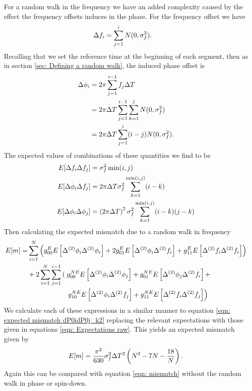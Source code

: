 For a random walk in the frequency we have an added complexity caused by the
effect the frequency offsets induces in the phase. For the frequency offset we 
have
\begin{align}
\Delta f_{i} &= \sum_{j=1}^{i}N(0, \sigma_{f}^{2}).
\end{align}
Recalling that we set the reference time at the beginning of each segment, 
then as in section \ref{sec: Defining a random walk}, the induced phase offset is
\begin{align}
\Delta\phi_{i} &=2\pi \sum_{j=1}^{i-1}f_{j}\Delta T \\
 & = 2\pi\Delta T \sum_{j=1}^{i-1}\sum_{k=1}^{j}N(0, \sigma_{f}^{2}) \\
& = 2\pi\Delta T \sum_{j=1}^{i}(i-j)N(0, \sigma_{f}^{2}).
\end{align}
The expected values of combinations of these quantities we find to be
\begin{align}
E[\Delta f_{i}\Delta f_{j}] & = \sigma_{f}^{2} \min(i, j) \\
E[\Delta\phi_{i}\Delta f_{j}] & = 2 \pi \Delta T \sigma_{f}^{2} \sum_{k=1}^{\min(i, j)}(i-k)\\
E[\Delta\phi_{i}\Delta\phi_{j}] & = 
\left(2\pi\Delta T\right)^{2}\sigma_{f}^{2} \sum_{k=1}^{\min(i, j)}(i-k)(j-k)
\label{eqn: Expectations raw}
\end{align}
Then calculating the expected mismatch due to a random walk in frequency 
\begin{align}
E[m] = & 
\s{i=1}{N}\left(g_{00}^{E}E\left[\Delta^{(2)}\phi_{i}\Delta^{(2)}\phi_{i}\right] 
+ 2 g_{01}^{E}E\left[\Delta^{(2)}\phi_{i}\Delta^{(2)}\f_{i}\right] 
+  g_{11}^{E} E\left[\Delta^{(2)}\f_{i}\Delta^{(2)}\f_{i}\right] \right) \\
& + 2\s{i=1}{N}\s{j=1}{i-1}\left(\right.
g_{00}^{NE}E\left[\Delta^{(2)}\phi_{i}\Delta^{(2)}\phi_{j}\right] + 
g_{01}^{NE}E\left[\Delta^{(2)}\phi_{j}\Delta^{(2)}\f_{i}\right] +  \\ 
&\hspace{20mm}\left. g_{10}^{NE}E\left[\Delta^{(2)}\phi_{i}\Delta^{(2)}\f_{j}\right] + 
g_{11}^{NE} E\left[\Delta^{(2)}\f_{i}\Delta^{(2)}\f_{j}\right] \right)
\end{align}
We calculate each of these expressions in a similar manner to equation
\eqref{eqn: expected mismatch dP0idP0j_k2} replacing the relevant expectations
with those given in equations \eqref{eqn: Expectations raw}. This yields an
expected mismatch given by 
\begin{equation}
E[m] = \frac{\pi^{2} }{630} \sigma_{f}^{2} \Delta T^{2}  \left(N^{3} - 7N- \frac{18}{N} \right).
\label{eqn: Expected mismatch RW in frequency k2}
\end{equation}
Again this can be compared with equation \eqref{eqn: mismatch} without the 
random walk in phase or spin-down. 
